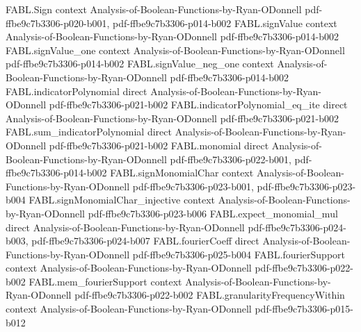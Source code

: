 \begin{theorem}
\label{FABL.fourierCoeff_majority_next_odd_eq}
\leanok
{}
\proofstep
  {FABL.Sign}
  {context}
  {Analysis-of-Boolean-Functions-by-Ryan-ODonnell}
  {pdf-ffbe9c7b3306-p020-b001,
    pdf-ffbe9c7b3306-p014-b002}
\proofstep
  {FABL.signValue}
  {context}
  {Analysis-of-Boolean-Functions-by-Ryan-ODonnell}
  {pdf-ffbe9c7b3306-p014-b002}
\proofstep
  {FABL.signValue_one}
  {context}
  {Analysis-of-Boolean-Functions-by-Ryan-ODonnell}
  {pdf-ffbe9c7b3306-p014-b002}
\proofstep
  {FABL.signValue_neg_one}
  {context}
  {Analysis-of-Boolean-Functions-by-Ryan-ODonnell}
  {pdf-ffbe9c7b3306-p014-b002}
\proofstep
  {FABL.indicatorPolynomial}
  {direct}
  {Analysis-of-Boolean-Functions-by-Ryan-ODonnell}
  {pdf-ffbe9c7b3306-p021-b002}
\proofstep
  {FABL.indicatorPolynomial_eq_ite}
  {direct}
  {Analysis-of-Boolean-Functions-by-Ryan-ODonnell}
  {pdf-ffbe9c7b3306-p021-b002}
\proofstep
  {FABL.sum_indicatorPolynomial}
  {direct}
  {Analysis-of-Boolean-Functions-by-Ryan-ODonnell}
  {pdf-ffbe9c7b3306-p021-b002}
\proofstep
  {FABL.monomial}
  {direct}
  {Analysis-of-Boolean-Functions-by-Ryan-ODonnell}
  {pdf-ffbe9c7b3306-p022-b001,
    pdf-ffbe9c7b3306-p014-b002}
\proofstep
  {FABL.signMonomialChar}
  {context}
  {Analysis-of-Boolean-Functions-by-Ryan-ODonnell}
  {pdf-ffbe9c7b3306-p023-b001,
    pdf-ffbe9c7b3306-p023-b004}
\proofstep
  {FABL.signMonomialChar_injective}
  {context}
  {Analysis-of-Boolean-Functions-by-Ryan-ODonnell}
  {pdf-ffbe9c7b3306-p023-b006}
\proofstep
  {FABL.expect_monomial_mul}
  {direct}
  {Analysis-of-Boolean-Functions-by-Ryan-ODonnell}
  {pdf-ffbe9c7b3306-p024-b003,
    pdf-ffbe9c7b3306-p024-b007}
\proofstep
  {FABL.fourierCoeff}
  {direct}
  {Analysis-of-Boolean-Functions-by-Ryan-ODonnell}
  {pdf-ffbe9c7b3306-p025-b004}
\proofstep
  {FABL.fourierSupport}
  {context}
  {Analysis-of-Boolean-Functions-by-Ryan-ODonnell}
  {pdf-ffbe9c7b3306-p022-b002}
\proofstep
  {FABL.mem_fourierSupport}
  {context}
  {Analysis-of-Boolean-Functions-by-Ryan-ODonnell}
  {pdf-ffbe9c7b3306-p022-b002}
\proofstep
  {FABL.granularityFrequencyWithin}
  {context}
  {Analysis-of-Boolean-Functions-by-Ryan-ODonnell}
  {pdf-ffbe9c7b3306-p015-b012}
\proofstep

\end{theorem}
